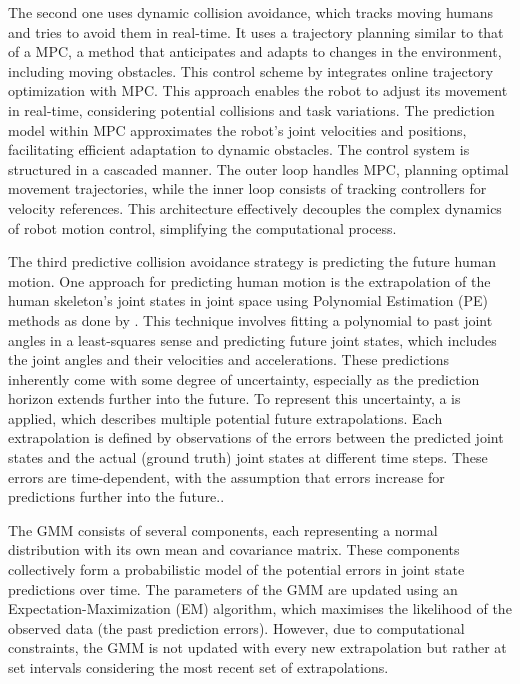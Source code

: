 The second one uses dynamic collision avoidance, which tracks moving humans and tries to avoid them in real-time. It uses a trajectory planning similar to that of a \gls{MPC}, a method that anticipates and adapts to changes in the environment, including moving obstacles.
This control scheme by \textcite{max} integrates online trajectory optimization with MPC. This approach enables the robot to adjust its movement in real-time, considering potential collisions and task variations. The prediction model within MPC approximates the robot's joint velocities and positions, facilitating efficient adaptation to dynamic obstacles.
The control system is structured in a cascaded manner. The outer loop handles MPC, planning optimal movement trajectories, while the inner loop consists of tracking controllers for velocity references. This architecture effectively decouples the complex dynamics of robot motion control, simplifying the computational process.\parencite{max}

The third predictive collision avoidance strategy is predicting the future human motion. One approach for predicting human motion is the extrapolation of the human skeleton's joint states in joint space using Polynomial Estimation (PE) methods as done by \textcite{renz1}. This technique involves fitting a polynomial to past joint angles in a least-squares sense and predicting future joint states, which includes the joint angles and their velocities and accelerations. These predictions inherently come with some degree of uncertainty, especially as the prediction horizon extends further into the future.
To represent this uncertainty, a  is applied, which describes multiple potential future extrapolations. Each extrapolation is defined by observations of the errors between the predicted joint states and the actual (ground truth) joint states at different time steps. These errors are time-dependent, with the assumption that errors increase for predictions further into the future.\parencite{renz2}.

The GMM consists of several components, each representing a normal distribution with its own mean and covariance matrix. These components collectively form a probabilistic model of the potential errors in joint state predictions over time. The parameters of the GMM are updated using an Expectation-Maximization (EM) algorithm, which maximises the likelihood of the observed data (the past prediction errors). However, due to computational constraints, the GMM is not updated with every new extrapolation but rather at set intervals considering the most recent set of extrapolations.

